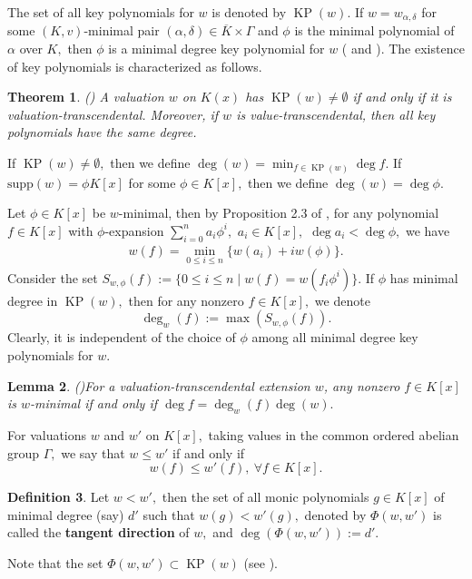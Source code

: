 \documentclass[11pt]{amsart}
\newtheorem{theorem}{Theorem}[section]
\newtheorem{lemma}[theorem]{Lemma}
\theoremstyle{definition}
\newtheorem{definition}[theorem]{Definition}
\theoremstyle{remark}
\numberwithin{equation}{section}
\begin{document}
	The set of all key polynomials for $w$ is denoted by $\operatorname{KP}(w).$ If $w=w_{\alpha,\delta}$ for some $(K,v)$-minimal pair $(\alpha,\delta)\in \overline{K}\times\Gamma$ and $\phi$  is the minimal polynomial of $\alpha$ over $K,$ then $\phi$ is a minimal degree key polynomial for $w$ (\cite[Theorem 1.1]{JN} and \cite[Theorem 2.21]{Ma}). 
The existence of key polynomials is characterized as follows.
\begin{theorem}(\cite[Theorem 4.4 and 4.2]{EN4})
	A valuation $w$ on $K(x)$ has $\operatorname{KP}(w)\neq\emptyset$ if and only if it is valuation-transcendental. Moreover, if $w$ is value-transcendental, then all key polynomials have the same degree.
\end{theorem}
If $\operatorname{KP}(w)\neq\emptyset,$ then we define $\deg (w)=\min_{f\in\operatorname{KP}(w)}\deg f.$ If $\text{supp}(w)=\phi K[x]$ for some $\phi\in K[x],$ then we define $\deg (w)=\deg\phi.$

		Let $\phi\in K[x]$ be  $w$-minimal, then by Proposition 2.3 of \cite{EN4}, for  any polynomial $f\in K[x]$ with $\phi$-expansion $\sum_{i=0}^{n}   a_i \phi^i,$ $a_i\in K[x],$  $\deg a_i<\deg \phi,$ we have 
	\begin{align*}
		w(f)=\min_{0 \leq i \leq n}\{w(a_i)+ iw(\phi)\}.
	\end{align*}
	Consider the set $S_{w,\phi}(f):=\{0\leq i\leq n\mid w(f)=w(f_i\phi^i)\}.$
	If $\phi$ has minimal degree in $\operatorname{KP}(w),$ then for any nonzero $f\in K[x],$ we denote   
	\[\deg_w(f):=\max(S_{w,\phi}(f)).\] Clearly, it is independent of the choice of $\phi$ among all minimal degree key polynomials for $w.$
	\begin{lemma}(\cite[Theorem 3.7]{EN4})\label{kpl1}
		For a valuation-transcendental extension $w$, any nonzero $f\in K[x]$ is $w$-minimal if and only if $\deg f=\deg_w(f)\deg(w).$	
	\end{lemma}
	
	For  valuations $w$ and $w'$ on $K[x],$ taking values in the  common ordered abelian group $\Gamma,$ we say that $w\leq w'$ if and only if 
	$$w(f)\leq w'(f),~\forall f\in K[x].$$
	\begin{definition}
		Let $w<w',$ then the set of all monic polynomials $g\in K[x]$ of minimal degree (say) $d'$ such that $w(g)<w'(g),$ denoted  by $\Phi(w,w')$ is called the {\bf tangent direction} of $w,$ and  $\deg(\Phi(w,w')) :=d'.$ 
\end{definition}
 Note that the set $\Phi(w,w')\subset \operatorname{KP}(w)$ (see \cite[Theorem 1.15]{V}).
\end{document}
